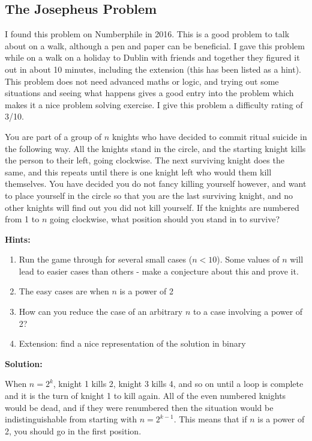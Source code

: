 \subsection{The Josepheus Problem}

I found this problem on Numberphile in 2016. This is a good problem to talk about on a walk, although a pen and paper can be beneficial. I gave this problem while on a walk on a holiday to Dublin with friends and together they figured it out in about 10 minutes, including the extension (this has been listed as a hint). This problem does not need advanced maths or logic, and trying out some situations and seeing what happens gives a good entry into the problem which makes it a nice problem solving exercise. I give this problem a difficulty rating of 3/10.

You are part of a group of $n$ knights who have decided to commit ritual suicide in the following way. All the knights stand in the circle, and the starting knight kills the person to their left, going clockwise. The next surviving knight does the same, and this repeats until there is one knight left who would them kill themselves. You have decided you do not fancy killing yourself however, and want to place yourself in the circle so that you are the last surviving knight, and no other knights will find out you did not kill yourself. If the knights are numbered from 1 to $n$ going clockwise, what position should you stand in to survive?

\textbf{Hints:}

\begin{enumerate}
	\item Run the game through for several small cases ($n < 10$). Some values of $n$ will lead to easier cases than others - make a conjecture about this and prove it.
	\item The easy cases are when $n$ is a power of 2
	\item How can you reduce the case of an arbitrary $n$ to a case involving a power of 2?
	\item Extension: find a nice representation of the solution in binary
\end{enumerate}

\textbf{Solution:}

When $n = 2^k$, knight 1 kills 2, knight 3 kills 4, and so on until a loop is complete and it is the turn of knight 1 to kill again. All of the even numbered knights would be dead, and if they were renumbered then the situation would be indistinguishable from starting with $n = 2^{k - 1}$. This means that if $n$ is a power of 2, you should go in the first position.

